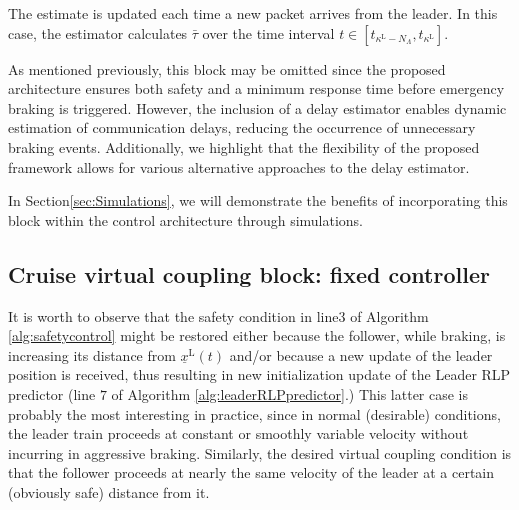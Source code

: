 The estimate is updated each time a new packet arrives from the leader. In this case, the estimator calculates \( \bar{\tau} \) over the time interval \( t \in [t_{\kappa^\mathrm{L}-N_\Lambda}, t_{\kappa^\mathrm{L}}] \).





As mentioned previously, this block may be omitted since the proposed architecture ensures both safety and a minimum response time before emergency braking is triggered. However, the inclusion of a delay estimator enables dynamic estimation of communication delays, reducing the occurrence of unnecessary braking events.
Additionally, we highlight that the flexibility of the proposed framework allows for various alternative approaches to the delay estimator.

In Section\tildeAdd\ref{sec:Simulations}, we will demonstrate the benefits of incorporating this block within the control architecture through simulations.




\subsection{Cruise virtual coupling block: fixed controller}
\label{subsec:vitrualcouplingblock} 

It is worth to observe that the safety condition in line\tildeAdd$3$ of  Algorithm \ref{alg:safetycontrol} might be restored either because the follower, while braking, is increasing its distance from $\underline{x}^\mathrm{L}(t)$ and/or because a new update of the leader position is received, thus resulting in new initialization update of the Leader RLP predictor (line $7$ of Algorithm \ref{alg:leaderRLPpredictor}.)
This latter case is probably the most interesting in practice, since in normal (desirable) conditions, the leader train proceeds at constant or smoothly variable velocity without incurring in aggressive braking. Similarly, the desired virtual coupling condition is that the follower proceeds at nearly the same velocity of the leader at a certain (obviously safe) distance from it. 



